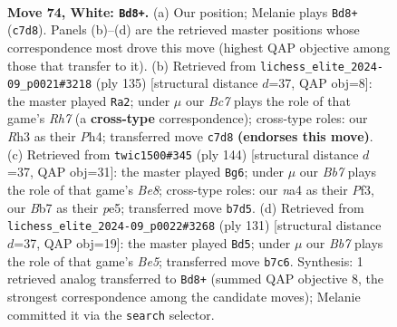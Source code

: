 \documentclass[11pt]{article}
\begin{document}
\clearpage

\begin{figure}[p]\centering
\begin{subfigure}{0.46\textwidth}\centering
\resizebox{\linewidth}{!}{%
\newchessgame
\chessboard[
  setfen={8/rBB5/3p1k1p/4p1b1/n3P2p/5P1R/4K3/8 w - - 17 74},
  showmover=false,
  pgfstyle=straightmove, color=movearrow, markmove={c7-d8}
]}
\caption{}
\end{subfigure}\hfill
\begin{subfigure}{0.46\textwidth}\centering
\resizebox{\linewidth}{!}{%
\newchessgame
\chessboard[
  setfen={8/6k1/P4p2/5Pp1/4K1Pp/5B2/7r/2R3b1 b - - 5 68},
  showmover=false,
  pgfstyle=straightmove, color=movearrow, markmove={h2-a2}
]}
\caption{}
\end{subfigure}
\\[4pt]
\begin{subfigure}{0.46\textwidth}\centering
\resizebox{\linewidth}{!}{%
\newchessgame
\chessboard[
  setfen={4Br1k/6p1/4Rb1p/4p2P/4K1P1/5P2/8/8 w - - 23 73},
  showmover=false,
  pgfstyle=straightmove, color=movearrow, markmove={e8-g6}
]}
\caption{}
\end{subfigure}\hfill
\begin{subfigure}{0.46\textwidth}\centering
\resizebox{\linewidth}{!}{%
\newchessgame
\chessboard[
  setfen={8/3r4/3P1kp1/7p/2R1bB1K/4P1P1/8/8 b - - 16 66},
  showmover=false,
  pgfstyle=straightmove, color=movearrow, markmove={e4-d5}
]}
\caption{}
\end{subfigure}
\caption{\textbf{Move 74, White: \texttt{Bd8+}.} (a) Our position; Melanie plays \texttt{Bd8+} (\texttt{c7d8}). Panels (b)--(d) are the retrieved master positions whose correspondence most drove this move (highest QAP objective among those that transfer to it). (b) Retrieved from \texttt{lichess\_elite\_2024-09\_p0021\#3218} (ply 135) [structural distance $d$=37, QAP obj=8]: the master played \texttt{Ra2}; under $\mu$ our \emph{Bc7} plays the role of that game's \emph{Rh7} (a \textbf{cross-type} correspondence); cross-type roles: our \emph{R}h3 as their \emph{P}h4; transferred move \texttt{c7d8} \textbf{(endorses this move)}. (c) Retrieved from \texttt{twic1500\#345} (ply 144) [structural distance $d$=37, QAP obj=31]: the master played \texttt{Bg6}; under $\mu$ our \emph{Bb7} plays the role of that game's \emph{Be8}; cross-type roles: our \emph{n}a4 as their \emph{P}f3, our \emph{B}b7 as their \emph{p}e5; transferred move \texttt{b7d5}. (d) Retrieved from \texttt{lichess\_elite\_2024-09\_p0022\#3268} (ply 131) [structural distance $d$=37, QAP obj=19]: the master played \texttt{Bd5}; under $\mu$ our \emph{Bb7} plays the role of that game's \emph{Be5}; transferred move \texttt{b7c6}. Synthesis: 1 retrieved analog transferred to \texttt{Bd8+} (summed QAP objective 8, the strongest correspondence among the candidate moves); Melanie committed it via the \texttt{search} selector.}
\label{fig:thought-m146}
\end{figure}
\end{document}

